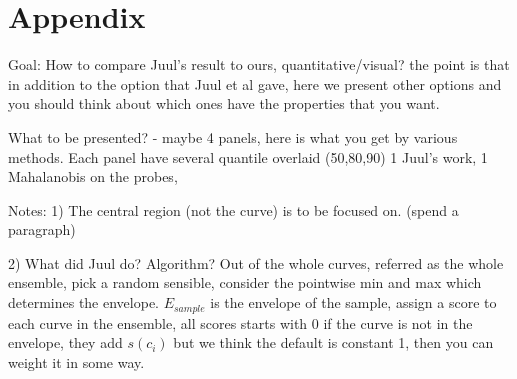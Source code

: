 \documentclass[12pt]{article}
\newcommand{\comment}{\showcomment}
\newcommand{\showcomment}[3]{\textcolor{#1}{\textbf{[#2: }\textsl{#3}\textbf{]}}}
\newcommand{\bmb}[1]{\comment{red}{BMB}{#1}}
\theoremstyle{definition} %
\begin{document}







\section{Appendix}


Goal: 
 How to compare Juul's result to ours, quantitative/visual? the point is that in addition to the option that Juul et al gave, here we present other options and you should think about which ones have the properties that you want.
 
What to be presented? 
- maybe 4 panels, here is what you get by various methods. Each panel have several quantile overlaid (50,80,90) 1 Juul's work, 1 Mahalanobis on the probes,  

Notes:
1) The central region (not the curve) is to be focused on. (spend a paragraph) 

2) What did Juul do? Algorithm? 
Out of the whole curves, referred as the whole ensemble, pick a random sensible, consider the pointwise min and max which determines the envelope. $E_{sample}$ is the envelope of the sample, assign a score to each curve in the ensemble, all scores starts with 0 if the curve is not in the envelope, they add $s(c_i)$ but we think the default is constant 1, then you can weight it in some way. 
\end{document}
